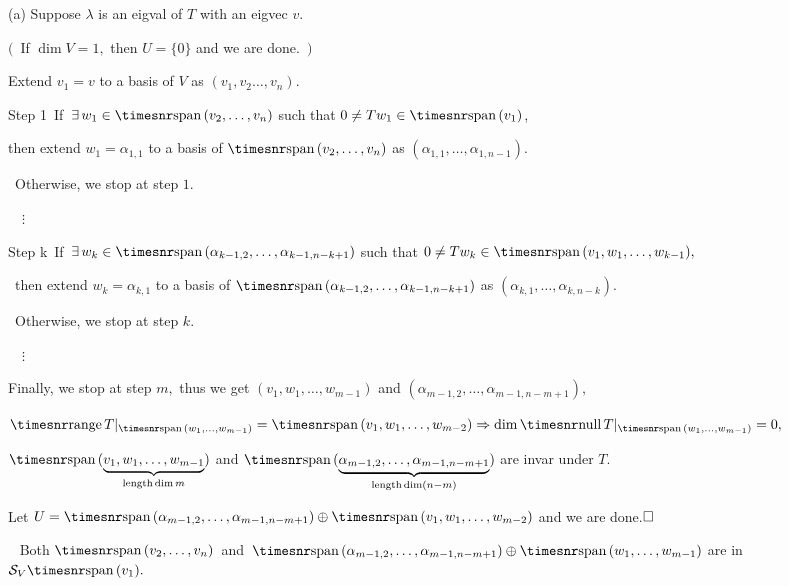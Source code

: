 \documentclass[a4paper, 11pt, UTF8]{article}
\def\range{{\timesnr\textup{range}}\,}
\def\null{{\timesnr\textup{null}}\,}
\def\Spn{{\timesnr\textup{span}}\,}
\def\Ha{\quad\hspace{8pt}}
\begin{document}
\begin{large}
(a) Suppose $\lambda$ is an eigval of $T$ with an eigvec $v.$\par\quad\Ha
$(\,$ If $\dim V=1,$ then $U=\{0\}$ and we are done. $\,)$\par\quad\Ha
Extend $v_1=v$ to a basis of $V$ as $(v_1,v_2\dots,v_n).$\par\quad\Ha
{\timesbf Step 1} $\,$If $\,\exists\,w_1\in\Spn(v_2,\dots,v_n)$ such that $0\neq Tw_1\in\Spn(v_1)$,\par\qquad\Ha\qquad
then extend $w_1=\alpha_{1,1}$ to a basis of $\Spn(v_2,\dots,v_n)$ as $(\alpha_{1,1},\dots,\alpha_{1,n-1}).$\par\qquad\qquad\quad\, Otherwise, we stop at step $1.$\par\quad\Ha
$\quad\vdots$\par\quad\Ha
{\timesbf Step k} $\,$If $\,\exists\,w_k\in\Spn(\alpha_{k-1,2},\dots,\alpha_{k-1,n-k+1})$ such that $0\neq Tw_k\in\Spn(v_1,w_1,\dots,w_{k-1}),$\par\qquad\qquad\quad\,
then extend $w_k=\alpha_{k,1}$ to a basis of $\Spn(\alpha_{k-1,2},\dots,\alpha_{k-1,n-k+1})$ as $(\alpha_{k,1},\dots,\alpha_{k,n-k}).$\par\qquad\qquad\quad\,
Otherwise, we stop at step $k.$\par\quad\Ha
$\quad\vdots$\par\quad\Ha
Finally, we stop at step $m,$ thus we get $(v_1,w_1,\dots,w_{m-1})$ and $(\alpha_{m-1,2},\dots,\alpha_{m-1,n-m+1}),$\par\quad\Ha
$\range T|_{\Spn(w_1,\dots,w_{m-1})}=\Spn(v_1,w_1,\dots,w_{m-2})\Rightarrow\dim\null T|_{\Spn(w_1,\dots,w_{m-1})}=0,$\par\quad\Ha
$\Spn(\underbrace{v_1,w_1,\dots,w_{m-1}}_{\textup{length} \dim m})$ and $\Spn(\underbrace{\alpha_{m-1,2},\dots,\alpha_{m-1,n-m+1}}_{\textup{length} \dim (n-m)})$ are invar under $T.$\par\quad\Ha
Let $U=\Spn(\alpha_{m-1,2},\dots,\alpha_{m-1,n-m+1})\oplus\Spn(v_1,w_1,\dots,w_{m-2})$ and we are done.$\hfill\square$\par\quad\Ha
\Comment\,\,\, Both $\Spn(v_2,\dots,v_n)$ \,{\small and}\, $\Spn(\alpha_{m-1,2},\dots,\alpha_{m-1,n-m+1})\oplus\Spn(w_1,\dots,w_{m-1})$ are in $\mathcal{S}_V \Spn(v_1).$\par\vspace{6pt}\quad

\end{large}
\end{document}
